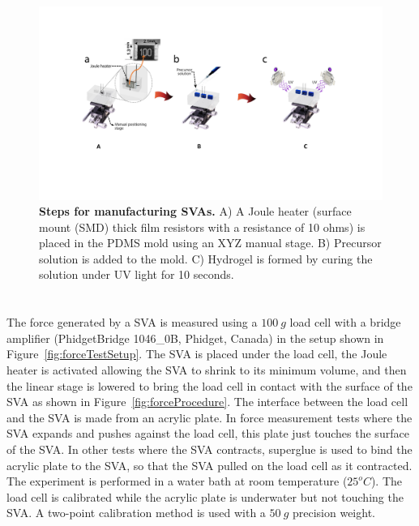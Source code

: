 \begin{figure}[h]
      \centering
      \includegraphics[width=\textwidth]{svaManufacturing.pdf}
      \caption[]{\textbf{Steps for manufacturing SVAs.} A) A Joule heater (surface mount (SMD) thick film resistors with a resistance of 10 ohms) is placed in the PDMS mold using an XYZ manual stage. B) Precursor solution is added to the mold. C) Hydrogel is formed by curing the solution under UV light for 10 seconds.}
      \label{fig:Manufac}
\end{figure}

\section{}
\label{sec:forcemeasur}
The force generated by a SVA is measured using a $100~g$ load cell with a bridge amplifier (PhidgetBridge 1046_0B, Phidget, Canada) in the setup shown in Figure~\ref{fig:forceTestSetup}. The SVA is placed under the load cell, the Joule heater is activated allowing the SVA to shrink to its minimum volume, and then the linear stage is lowered to bring the load cell in contact with the surface of the SVA as shown in Figure~\ref{fig:forceProcedure}. The interface between the load cell and the SVA is made from an acrylic plate. In force measurement tests where the SVA expands and pushes against the load cell, this plate just touches the surface of the SVA. In other tests where the SVA contracts, superglue is used to bind the acrylic plate to the SVA, so that the SVA pulled on the load cell as it contracted. The experiment is performed in a water bath at room temperature ($25^oC$). The load cell is calibrated while the acrylic plate is underwater but not touching the SVA. A two-point calibration method is used with a $50~g$ precision weight. 


